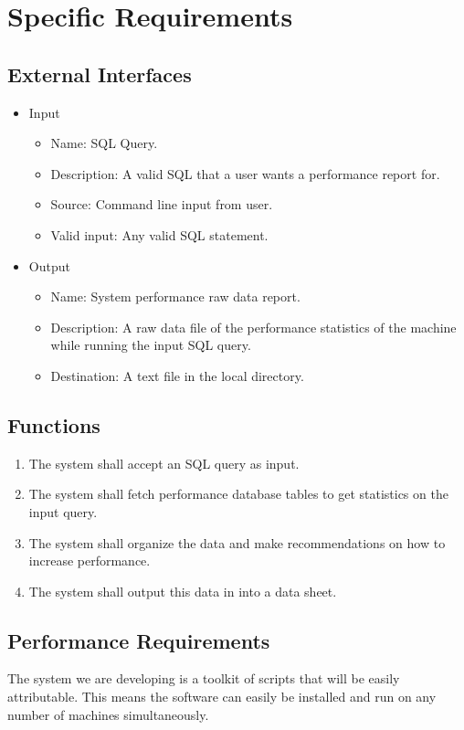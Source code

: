 \documentclass[draftclsnofoot, onecolumn, compsoc, 10pt]{IEEEtran}
\begin{document}
\section{Specific Requirements}

\subsection{External Interfaces}
\begin{itemize}
	\item Input
    \begin{itemize}
    	\item Name: SQL Query.
        \item Description: A valid SQL that a user wants a performance report for.
        \item Source: Command line input from user. 
        \item Valid input: Any valid SQL statement.
    \end{itemize}
    \item Output
    \begin{itemize}
    	\item Name: System performance raw data report.
        \item Description: A raw data file of the performance statistics of the machine while running the input SQL query.
        \item Destination: A text file in the local directory.
    \end{itemize}
\end{itemize}

\subsection{Functions}
\begin{enumerate}
	\item The system shall accept an SQL query as input.
    \item The system shall fetch performance database tables to get statistics on the input query.
    \item The system shall organize the data and make recommendations on how to increase performance.
    \item The system shall output this data in into a data sheet.
\end{enumerate}

\subsection{Performance Requirements}
The system we are developing is a toolkit of scripts that will be easily attributable. 
This means the software can easily be installed and run on any number of machines simultaneously. 
\end{document}
